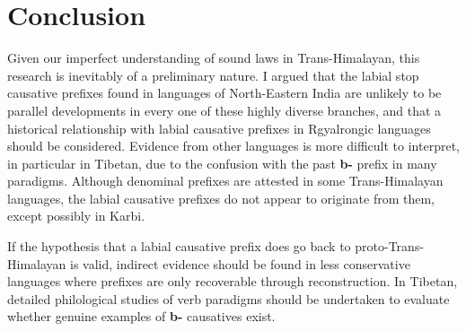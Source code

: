 \documentclass[oneside,a4paper,11pt]{article}
\newcommand{\ipa}[1]{\textbf{{\phon\mbox{#1}}}} %
\begin{document}
 \section{Conclusion}
Given our imperfect understanding of sound laws in Trans-Himalayan, this research is inevitably of a preliminary nature. I argued that the labial stop causative prefixes found in languages of North-Eastern India are unlikely to be parallel developments in every one of these highly diverse branches, and that a historical relationship with labial causative prefixes in Rgyalrongic languages should be considered. Evidence from other languages is more difficult to interpret, in particular in Tibetan, due to the confusion with the past \ipa{b-} prefix in many paradigms. Although denominal prefixes are attested in some Trans-Himalayan languages, the labial causative prefixes do not appear to originate from  them, except possibly in Karbi.

If the hypothesis that a labial causative prefix does go back to proto-Trans-Himalayan is valid, indirect evidence should be found in less conservative languages where prefixes are only recoverable through reconstruction. In Tibetan, detailed philological studies of verb paradigms should be undertaken to evaluate whether genuine examples of \ipa{b-} causatives exist. 
 
 \phon


\end{document}
